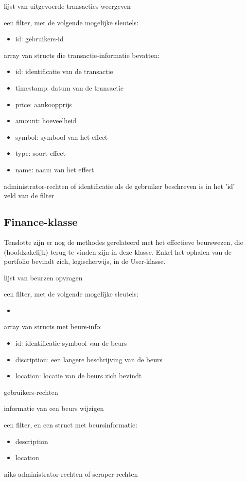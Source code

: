 	{ lijst van uitgevoerde transacties weergeven }
	{ een filter, met de volgende mogelijke sleutels:
		\begin{itemize}
		\item{id: gebruikers-id}
		\end{itemize} }
	{ array van structs die transactie-informatie bevatten:
		\begin{itemize}
		\item{id: identificatie van de transactie}
		\item{timestamp: datum van de transactie}
		\item{price: aankoopprijs}
		\item{amount: hoeveelheid}
		\item{symbol: symbool van het effect}
		\item{type: soort effect}
		\item{name: naam van het effect}
		\end{itemize} }
	{ administrator-rechten of identificatie als de gebruiker beschreven is in het 'id' veld van de filter }

\subsection{Finance-klasse}

Tenslotte zijn er nog de methodes gerelateerd met het effectieve beurswezen, die (hoofdzakelijk) terug te vinden zijn in deze klasse. Enkel het ophalen van de portfolio bevindt zich, logischerwijs, in de User-klasse.

	{ lijst van beurzen opvragen }
	{ een filter, met de volgende mogelijke sleutels:
		\begin{itemize}
		\item{}
		\end{itemize} }
	{ array van structs met beurs-info:
		\begin{itemize}
		\item{id: identificatie-symbool van de beurs}
		\item{discription: een langere beschrijving van de beurs}
		\item{location: locatie van de beurs zich bevindt}
		\end{itemize} }
	{ gebruikers-rechten }

	{ informatie van een beurs wijzigen }
	{ een filter, en een struct met beursinformatie:
		\begin{itemize}
		\item{description}
		\item{location}
		\end{itemize} }
	{ niks }
	{ administrator-rechten of scraper-rechten }

